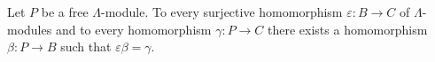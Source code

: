 Let $P$ be a free $\Lambda$-module. To every surjective homomorphism $\varepsilon : B \rightarrow C$ of $\Lambda$-modules and to every homomorphism $\gamma : P \rightarrow C$ there exists a homomorphism $\beta : P \rightarrow B$ such that $\varepsilon \beta = \gamma$.
